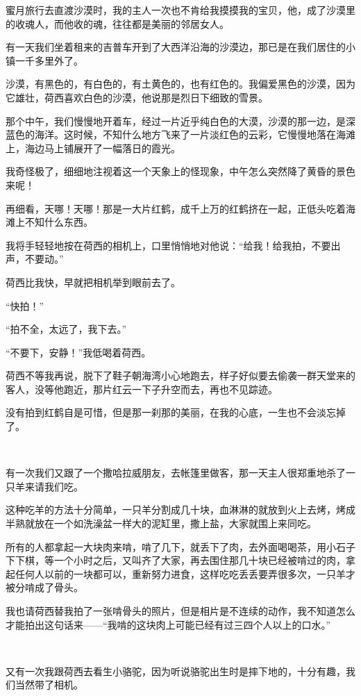 \par 蜜月旅行去直渡沙漠时，我的主人一次也不肯给我摸摸我的宝贝，他，成了沙漠里的收魂人，而他收的魂，往往都是美丽的邻居女人。
\par 有一天我们坐着租来的吉普车开到了大西洋沿海的沙漠边，那已是在我们居住的小镇一千多里外了。
\par 沙漠，有黑色的，有白色的，有土黄色的，也有红色的。我偏爱黑色的沙漠，因为它雄壮，荷西喜欢白色的沙漠，他说那是烈日下细致的雪景。
\par 那个中午，我们慢慢地开着车，经过一片近乎纯白色的大漠，沙漠的那一边，是深蓝色的海洋。这时候，不知什么地方飞来了一片淡红色的云彩，它慢慢地落在海滩上，海边马上铺展开了一幅落日的霞光。
\par 我奇怪极了，细细地注视着这一个天象上的怪现象，中午怎么突然降了黄昏的景色来呢！
\par 再细看，天哪！天哪！那是一大片红鹤，成千上万的红鹤挤在一起，正低头吃着海滩上不知什么东西。
\par 我将手轻轻地按在荷西的相机上，口里悄悄地对他说：“给我！给我拍，不要出声，不要动。”
\par 荷西比我快，早就把相机举到眼前去了。
\par “快拍！”
\par “拍不全，太远了，我下去。”
\par “不要下，安静！”我低喝着荷西。
\par 荷西不等我再说，脱下了鞋子朝海湾小心地跑去，样子好似要去偷袭一群天堂来的客人，没等他跑近，那片红云一下子升空而去，再也不见踪迹。
\par 没有拍到红鹤自是可惜，但是那一刹那的美丽，在我的心底，一生也不会淡忘掉了。
\par  
\par 有一次我们又跟了一个撒哈拉威朋友，去帐篷里做客，那一天主人很郑重地杀了一只羊来请我们吃。
\par 这种吃羊的方法十分简单，一只羊分割成几十块，血淋淋的就放到火上去烤，烤成半熟就放在一个如洗澡盆一样大的泥缸里，撒上盐，大家就围上来同吃。
\par 所有的人都拿起一大块肉来啃，啃了几下，就丢下了肉，去外面喝喝茶，用小石子下下棋，等一个小时之后，又叫齐了大家，再去围住那几十块已经被啃过的肉，拿起任何人以前的一块都可以，重新努力进食，这样吃吃丢丢要弄很多次，一只羊才被分啃成了骨头。
\par 我也请荷西替我拍了一张啃骨头的照片，但是相片是不连续的动作，我不知道怎么才能拍出这句话来——“我啃的这块肉上可能已经有过三四个人以上的口水。”
\par  
\par 又有一次我跟荷西去看生小骆驼，因为听说骆驼出生时是摔下地的，十分有趣，我们当然带了相机。
